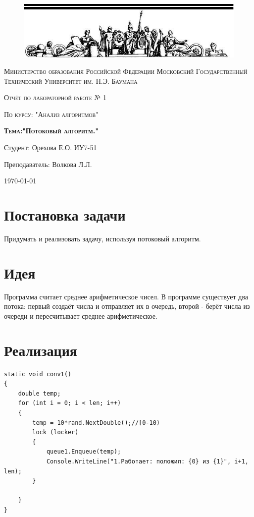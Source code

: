 \documentclass[a4paper,12pt]{article}
\begin{document}
\begin{titlepage}
	\centering
    \begin{figure}[H]
    	\includegraphics[scale=1.2]{photo}
   	\end{figure}
	{\scshape Министерство образования Российской Федерации
Московский Государственный Технический Университет им. Н.Э. Баумана \par}
	\vspace{4cm}
	{\scshape\Large Отчёт по лабораторной работе № 1\par}
    {\scshape\Large По курсу: "Анализ алгоритмов"\par}
	{\scshape\Large\bf Тема:"Потоковый алгоритм."\par}
    \vspace{2cm}
    {\flushright Студент: Орехова Е.О. ИУ7-51\par
    \flushright Преподаватель: Волкова Л.Л.\par}
    \vspace{2cm}
	{\large \today\par}
\end{titlepage}

\def\contentaname{Содержание}
\tableofcontents %
\clearpage

\section{Постановка задачи}
    Придумать и реализовать задачу, используя потоковый алгоритм.

\section{Идея}
    Программа считает среднее арифметическое чисел. В программе существует два потока: первый создаёт числа и отправляет их в очередь, второй - берёт числа из очереди и пересчитывает среднее арифметическое.
	
    
\section{Реализация}
\begin{lstlisting}[label=some-code,caption={Производитель чисел}]
static void conv1()
{
	double temp;
	for (int i = 0; i < len; i++)
	{
		temp = 10*rand.NextDouble();//[0-10)
		lock (locker)
		{
			queue1.Enqueue(temp);
			Console.WriteLine("1.Работает: положил: {0} из {1}", i+1, len);
		}
		
	}
}
\end{lstlisting}
\end{document}
